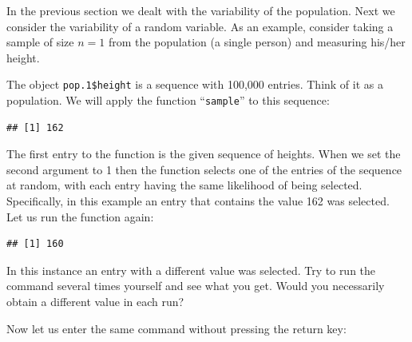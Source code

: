 \documentclass[
]{krantz}
\makeatletter
\newenvironment{Shaded}{\begin{snugshade}}{\end{snugshade}}
\newcommand{\DecValTok}[1]{\textcolor[rgb]{0.00,0.00,0.81}{#1}}
\newcommand{\FloatTok}[1]{\textcolor[rgb]{0.00,0.00,0.81}{#1}}
\newcommand{\KeywordTok}[1]{\textcolor[rgb]{0.13,0.29,0.53}{\textbf{#1}}}
\newcommand{\NormalTok}[1]{#1}
\newcommand{\OperatorTok}[1]{\textcolor[rgb]{0.81,0.36,0.00}{\textbf{#1}}}
\newenvironment{kframe}{%
\medskip{}
\setlength{\fboxsep}{.8em}
 \def\at@end@of@kframe{}%
 \ifinner\ifhmode%
  \def\at@end@of@kframe{\end{minipage}}%
  \begin{minipage}{\columnwidth}%
 \fi\fi%
 \def\FrameCommand##1{\hskip\@totalleftmargin \hskip-\fboxsep
 \colorbox{shadecolor}{##1}\hskip-\fboxsep
     \hskip-\linewidth \hskip-\@totalleftmargin \hskip\columnwidth}%
 \MakeFramed {\advance\hsize-\width
   \@totalleftmargin\z@ \linewidth\hsize
   \@setminipage}}%
 {\par\unskip\endMakeFramed%
 \at@end@of@kframe}
\renewenvironment{Shaded}{\begin{kframe}}{\end{kframe}}
\theoremstyle{definition}
\theoremstyle{definition}
\theoremstyle{definition}
\theoremstyle{remark}
\makeatother
\begin{document}
In the previous section we dealt with the variability of the population.
Next we consider the variability of a random variable. As an example,
consider taking a sample of size \(n=1\) from the population (a single
person) and measuring his/her height.

The object \texttt{pop.1\$height} is a sequence with 100,000 entries. Think of
it as a population. We will apply the function ``\texttt{sample}'' to this
sequence:

\begin{Shaded}
\end{Shaded}

\begin{verbatim}
## [1] 162
\end{verbatim}

The first entry to the function is the given sequence of heights. When
we set the second argument to 1 then the function selects one of the
entries of the sequence at random, with each entry having the same
likelihood of being selected. Specifically, in this example an entry
that contains the value 162 was selected. Let us run the function again:

\begin{Shaded}
\end{Shaded}

\begin{verbatim}
## [1] 160
\end{verbatim}

In this instance an entry with a different value was selected. Try to
run the command several times yourself and see what you get. Would you
necessarily obtain a different value in each run?

Now let us enter the same command without pressing the return key:

\begin{Shaded}
\end{Shaded}
\end{document}
